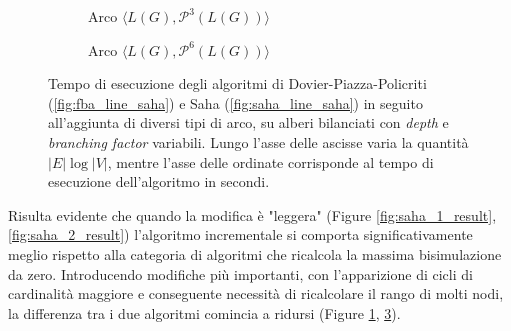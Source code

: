 \begin{figure}[H]
\begin{subfigure}[b]{0.49\textwidth}
            \caption{Arco $\langle L(G), \mathcal{P}^3(L(G))\rangle$}
            \label{fig:saha_3_result}
        \end{subfigure}
        \begin{subfigure}[b]{0.49\textwidth}
            \caption{Arco $\langle L(G), \mathcal{P}^6(L(G))\rangle$}
            \label{fig:saha_4_result}
        \end{subfigure}
    \caption{Tempo di esecuzione degli algoritmi di Dovier-Piazza-Policriti (\ref*{fig:fba_line_saha}) e Saha (\ref*{fig:saha_line_saha}) in seguito all'aggiunta di diversi tipi di arco, su alberi bilanciati con \emph{depth} e \emph{branching factor} variabili. Lungo l'asse delle ascisse varia la quantità $|E|\log|V|$, mentre l'asse delle ordinate corrisponde al tempo di esecuzione dell'algoritmo in secondi.}
\end{figure}

Risulta evidente che quando la modifica è "leggera" (Figure \ref{fig:saha_1_result}, \ref{fig:saha_2_result}) l'algoritmo incrementale si comporta significativamente meglio rispetto alla categoria di algoritmi che ricalcola la massima bisimulazione da zero. Introducendo modifiche più importanti, con l'apparizione di cicli di cardinalità maggiore e conseguente necessità di ricalcolare il rango di molti nodi, la differenza tra i due algoritmi comincia a ridursi (Figure \ref{fig:saha_3_result}, \ref{fig:saha_4_result}).

